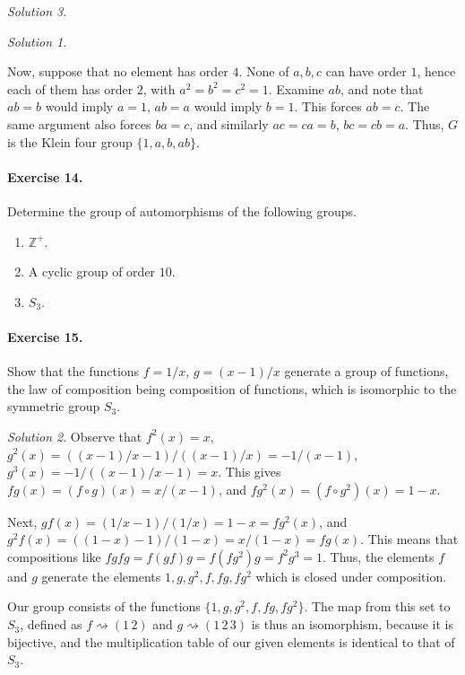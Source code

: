 \documentclass[11pt]{report}
\def\Z{\mathbb{Z}}
\theoremstyle{remark}
\newtheorem*{solution}{Solution}
\begin{document}
\begin{solution}
\begin{solution}
\begin{enumerate}
        Now, suppose that no element has order $4$. None of $a, b, c$ can have order
        $1$, hence each of them has order $2$, with $a^2 = b^2 = c^2 = 1$. Examine
        $ab$, and note that $ab = b$ would imply $a = 1$, $ab = a$ would imply $b =
        1$. This forces $ab = c$. The same argument also forces $ba = c$, and
        similarly $ac = ca = b$, $bc = cb = a$. Thus, $G$ is the Klein four group
        $\{1, a, b, ab\}$.
    \end{enumerate}
    \end{solution}

    \paragraph{Exercise 14.} Determine the group of automorphisms of the following
    groups.
    \begin{enumerate}
        \itemsep0em
        \item $\Z^+$.
        \item A cyclic group of order $10$.
        \item $S_3$.
    \end{enumerate}


    \paragraph{Exercise 15.} Show that the functions $f = 1 / x$, $g = (x - 1) / x$
    generate a group of functions, the law of composition being composition of
    functions, which is isomorphic to the symmetric group $S_3$.
    \begin{solution}
        Observe that $f^2(x) = x$, $g^2(x) = ((x - 1) / x - 1) / ((x - 1) / x) = - 1
        / (x - 1)$, $g^3(x) = -1 / ((x - 1) / x - 1) = x$. This gives $fg(x) =
        (f\circ g)(x) = x / (x - 1)$, and $fg^2(x) = (f\circ g^2)(x) = 1 - x$.

        Next, $gf(x) = (1 / x - 1) / (1 / x) = 1 - x = fg^2(x)$, and $g^2f(x) = ((1
        - x) - 1) / (1 - x) = x / (1 - x) = fg(x)$. This means that compositions
        like $fgfg = f(gf)g = f(fg^2)g = f^2g^3 = 1$. Thus, the elements $f$ and $g$
        generate the elements $1, g, g^2, f, fg, fg^2$ which is closed under
        composition.

        Our group consists of the functions $\{1, g, g^2, f, fg, fg^2\}$. The map
        from this set to $S_3$, defined as $f \rightsquigarrow (1\,2)$ and $g
        \rightsquigarrow (1\, 2\, 3)$ is thus an isomorphism, because it is
        bijective, and the multiplication table of our given elements is identical
        to that of $S_3$.
    \end{solution}
    

\end{solution}
\end{document}
